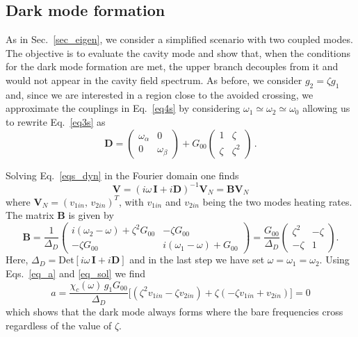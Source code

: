 \documentclass[aps,PRA,%
 amsmath,amssymb,
singlecolumn,
notitlepage,superscriptaddress,groupedaddress]{revtex4}
\newcommand{\di}{i}
\begin{document}
\subsection{Dark mode formation}
As in Sec.~\ref{sec_eigen}, we consider a simplified scenario with two coupled modes. The objective is to evaluate the cavity mode and show that, when the conditions for the dark mode formation are met, the upper branch decouples from it and would not appear in the cavity field spectrum. As before, we consider $g_2=\zeta g_1$ and, since we are interested in a region close to the avoided crossing, we approximate the couplings in Eq.~\ref{eq4s} by considering $\omega_{1}\simeq\omega_{2}\simeq\omega_0$ allowing us to rewrite Eq.~\ref{eq3s} as
\begin{equation}
    \mathbf{D}=\begin{pmatrix}
        \omega_\alpha&0\\
        0&\omega_\beta
    \end{pmatrix}+
    G_{00}\begin{pmatrix}
        1 & \zeta\\
        \zeta&\zeta^2
    \end{pmatrix} \, .
\end{equation}

\noindent Solving Eq.~\ref{eqs_dyn} in the Fourier domain one finds
\begin{equation}
    \mathbf{V}=(\di\omega\,\mathbf{I}+\di\mathbf{D})^{-1}\mathbf{V}_N=\mathbf{B}\mathbf{V}_N
\end{equation}
\noindent where $\mathbf{V}_N=(v_{1in},\, v_{2in})^{T}$, with $v_{1in}$ and $v_{2in}$ being the two modes heating rates. The matrix $\mathbf{B}$ is given by
\begin{equation}\label{eq_sol}
    \mathbf{B}=\frac{1}{\Delta_D}\begin{pmatrix}
        \di(\omega_2-\omega)+\zeta^2G_{00}&-\zeta G_{00}\\
        -\zeta G_{00}&\di(\omega_1-\omega)+G_{00}
    \end{pmatrix}=\frac{G_{00}}{\Delta_D}\begin{pmatrix}
        \zeta^2&-\zeta\\
        -\zeta&1
    \end{pmatrix}.
\end{equation}
Here, $\Delta_D=\mathrm{Det}[\di\omega\,\mathbf{I}+\di\mathbf{D}]$ and in the last step we have set $\omega=\omega_1=\omega_2$. 
Using Eqs.~\ref{eq_a} and \ref{eq_sol} we find
\begin{equation}
    a=\frac{\chi_c(\omega)\,g_1 G_{00}}{\Delta_D}\bigg[ \left( \zeta^2 v_{1in}-\zeta v_{2in}\right)+\zeta \left( -\zeta v_{1in}+v_{2in} \right)   \bigg]=0
\end{equation}
\noindent which shows that the dark mode always forms where the bare frequencies cross regardless of the value of $\zeta$.
\end{document}
